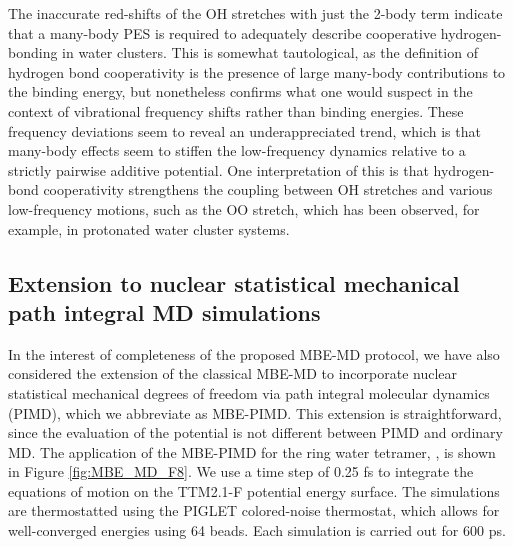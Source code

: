 \documentclass[11pt, proquest]{uwthesis}[2020/02/24]
\let\ce\ch
\begin{document}
\par The inaccurate red-shifts of the OH stretches with just the 2-body term indicate that a many-body PES is required to adequately describe cooperative hydrogen-bonding in water clusters. This is somewhat tautological, as the definition of hydrogen bond cooperativity is the presence of large many-body contributions to the binding energy, but nonetheless confirms what one would suspect in the context of vibrational frequency shifts rather than binding energies. These frequency deviations seem to reveal an underappreciated trend, which is that many-body effects seem to stiffen the low-frequency dynamics relative to a strictly pairwise additive potential. One interpretation of this is that hydrogen-bond cooperativity strengthens the coupling between OH stretches and various low-frequency motions, such as the OO stretch, which has been observed, for example, in protonated water cluster systems.\autocite{duong_tag-free_2018}

\subsection{Extension to nuclear statistical mechanical path integral MD simulations}

\par In the interest of completeness of the proposed MBE-MD protocol, we have also considered the extension of the classical MBE-MD to incorporate nuclear statistical mechanical degrees of freedom via path integral molecular dynamics (PIMD),\autocite{chandler_exploiting_1981,feynman_quantum_2010} which we abbreviate as MBE-PIMD. This extension is straightforward, since the evaluation of the potential is not different between PIMD and ordinary MD. The application of the MBE-PIMD for the ring water tetramer, \ce{(H2O)4}, is shown in Figure \ref{fig:MBE_MD_F8}. We use a time step of 0.25 fs to integrate the equations of motion on the TTM2.1-F potential energy surface. The simulations are thermostatted using the PIGLET colored-noise thermostat\autocite{ceriotti_efficient_2012}, which allows for well-converged energies using 64 beads. Each simulation is carried out for 600 ps.


\end{document}
